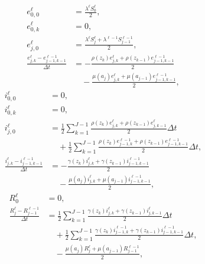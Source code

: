 \documentclass{jpmarticle}
\begin{document}
\begin{equation}
  \begin{split}
    e_{0, 0}^{\ell}
    &=
    \frac{\lambda^{\ell} S_0^{\ell}}
    {2},
    \\
    e_{0, k}^{\ell}
    &= 0,
    \\
    e_{j, 0}^{\ell}
    &=
    \frac{\lambda^{\ell} S_j^{\ell}
      + \lambda^{\ell - 1} S_{j - 1}^{\ell - 1}}
    {2},
    \\
    \frac{e_{j, k}^{\ell} - e_{j - 1, k - 1}^{\ell - 1}}{\Delta t}
    &=
    - \frac{\rho(z_k) e_{j, k}^{\ell}
      + \rho(z_{k - 1}) e_{j - 1, k - 1}^{\ell - 1}}
    {2}
    \\ & \quad {}
    - \frac{\mu(a_j) e_{j, k}^{\ell}
      + \mu(a_{j - 1}) e_{j - 1, k - 1}^{\ell - 1}}
    {2},
  \end{split}
\end{equation}
\begin{equation}
  \begin{split}
    i_{0, 0}^{\ell}
    &= 0,
    \\
    i_{0, k}^{\ell}
    &= 0,
    \\
    i_{j, 0}^{\ell}
    &=
    \frac{1}{2} \sum_{k = 1}^{J - 1}
    \frac{\rho(z_k) e_{j, k}^{\ell}
      + \rho(z_{k - 1}) e_{j, k - 1}^{\ell}}
    {2}
    \Delta t
    \\ & \quad {}
    + \frac{1}{2} \sum_{k = 1}^{J - 1}
    \frac{\rho(z_k) e_{j - 1, k}^{\ell - 1}
      + \rho(z_{k - 1}) e_{j - 1, k - 1}^{\ell - 1}}
    {2}
    \Delta t
    ,
    \\
    \frac{i_{j, k}^{\ell} - i_{j - 1, k - 1}^{\ell - 1}}{\Delta t}
    &=
    - \frac{\gamma(z_k) i_{j, k}^{\ell}
      + \gamma(z_{k - 1}) i_{j - 1, k - 1}^{\ell - 1}}
    {2}
    \\ & \quad {}
    - \frac{\mu(a_j) i_{j, k}^{\ell}
      + \mu(a_{j - 1}) i_{j - 1, k - 1}^{\ell - 1}}
    {2},
  \end{split}
\end{equation}
\begin{equation}
  \begin{split}
    R_0^{\ell}
    &= 0,
    \\
    \frac{R_j^{\ell} - R_{j - 1}^{\ell - 1}}{\Delta t}
    &=
    \frac{1}{2} \sum_{k = 1}^{J - 1}
    \frac{\gamma(z_k) i_{j, k}^{\ell}
      + \gamma(z_{k - 1}) i_{j, k - 1}^{\ell}}
    {2}
    \Delta t
    \\ & \quad {}
    + \frac{1}{2} \sum_{k = 1}^{J - 1}
    \frac{\gamma(z_k) i_{j - 1, k}^{\ell - 1}
      + \gamma(z_{k - 1}) i_{j - 1, k - 1}^{\ell - 1}}
    {2}
    \Delta t,
    \\ & \quad {}
    - \frac{\mu(a_j) R_j^{\ell}
      + \mu(a_{j - 1})R_{j - 1}^{\ell - 1}}
    {2},
  \end{split}
\end{equation}
\end{document}
